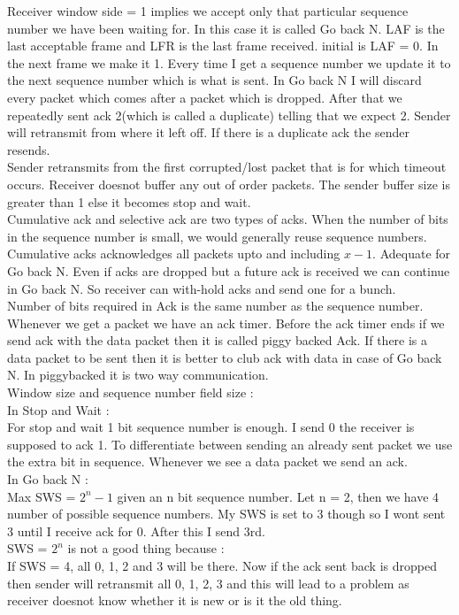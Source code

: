\documentclass[solution,addpoints,12pt]{exam}
\begin{document}
Receiver window side = 1 implies we accept only that particular
sequence number we have been waiting for. In this case it is called Go back N.
LAF is the last acceptable frame and LFR is the last frame received.
initial is LAF = 0. In the next frame we make it 1. Every time
I get a sequence number we update it to the next sequence number
which is what is sent. In Go back N I will discard
every packet which comes after a packet which is dropped.
After that we repeatedly sent ack 2(which is called a duplicate) telling
that we expect 2. Sender will retransmit from where it left off.
If there is a duplicate ack the sender resends.\\

Sender retransmits from the first corrupted/lost packet that
is for which timeout occurs. Receiver doesnot buffer any out of
order packets. The sender buffer size is greater than 1 else
it becomes stop and wait.\\
Cumulative ack and selective ack are two types of acks.
When the number of bits in the sequence number is small,
we would generally reuse sequence numbers.\\
Cumulative acks acknowledges all packets upto and including
$x-1$. Adequate for Go back N. Even if acks are dropped
but a future ack is received we can continue in Go back N.
So receiver can with-hold acks and send one for a bunch.\\

Number of bits required in Ack is
the same number as the sequence number. Whenever we get a
packet we have an ack timer. Before the ack timer ends
if we send ack with the data packet then it is called
piggy backed Ack. If there is a data packet to be
sent then it is better to club ack with data in case of Go back N.
In piggybacked it is two way communication.\\

Window size and sequence number field size :\\
In Stop and Wait :\\
For stop and wait 1 bit sequence number is enough.
I send 0 the receiver is supposed to ack 1. To differentiate
between sending an already sent packet we use the extra bit in
sequence. Whenever we see a data packet we send an ack.\\

In Go back N :\\
Max SWS = $2^n - 1$ given an n bit sequence number.
Let n = 2, then we have 4 number of possible sequence numbers.
My SWS is set to 3 though so I wont sent 3 until I receive
ack for 0. After this I send 3rd.\\
SWS = $2^n$ is not a good thing because :\\
If SWS = 4, all 0, 1, 2 and 3 will be there.
Now if the ack sent back is dropped
then sender will retransmit all 0, 1, 2, 3 and this will
lead to a problem as receiver doesnot know whether it is
new or is it the old thing.
\end{document}
